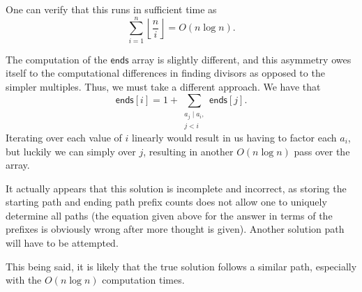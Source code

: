 \documentclass[a4paper, 12pt]{article}
\begin{document}
\begin{solution}[\textcolor{red}{Incorrect}]
    One can verify that this runs in sufficient time as
    \[
        \sum_{i = 1}^{n} \left\lfloor \frac{n}{i} \right\rfloor = O(n \log{n})
    .\]

    The computation of the \( \textsf{ends} \) array is slightly different, and this asymmetry owes itself to the computational differences in finding divisors as opposed to the simpler multiples. Thus, we must take a different approach. We have that
    \[
        \textsf{ends}[i] = 1 + \sum_{\substack{a_j \mid a_i, \\ j < i}} \textsf{ends}[j]
    .\]
    Iterating over each value of \( i \) linearly would result in us having to factor each \( a_i \), but luckily we can simply over \( j \), resulting in another \( O(n \log{n}) \) pass over the array.

    It actually appears that this solution is incomplete and incorrect, as
storing the starting path and ending path prefix counts does not allow one to
uniquely determine all paths (the equation given above for the answer in terms
of the prefixes is obviously wrong after more thought is given). Another
solution path will have to be attempted.

    This being said, it is likely that the true solution follows a similar path, especially with the \( O(n \log{n}) \) computation times.
\end{solution}

\begin{solution}
\end{solution}
\end{document}
